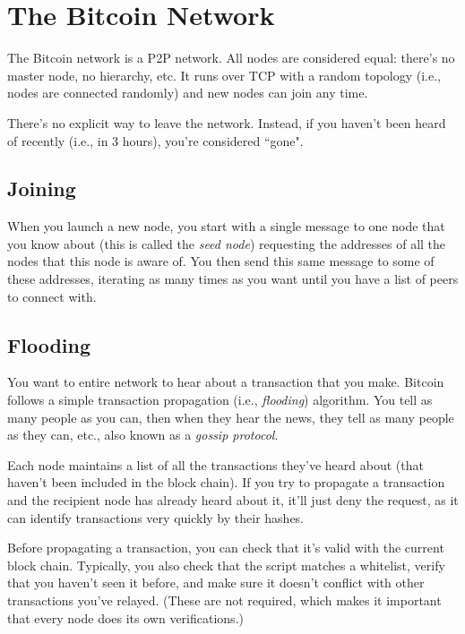 \documentclass[12pt]{article}
\begin{document}
\section*{The Bitcoin Network}

The Bitcoin network is a P2P network. All nodes are considered equal: there's no master node, no hierarchy, etc. It runs over TCP with a random topology (i.e., nodes are connected randomly) and new nodes can join any time.

There's no explicit way to leave the network. Instead, if you haven't been heard of recently (i.e., in 3 hours), you're considered ``gone".

\subsection*{Joining}

When you launch a new node, you start with a single message to one node that you know about (this is called the \textit{seed node}) requesting the addresses of all the nodes that this node is aware of. You then send this same message to some of these addresses, iterating as many times as you want until you have a list of peers to connect with.

\subsection*{Flooding}

You want to entire network to hear about a transaction that you make. Bitcoin follows a simple transaction propagation (i.e., \textit{flooding}) algorithm. You tell as many people as you can, then when they hear the news, they tell as many people as they can, etc., also known as a \textit{gossip protocol}.

Each node maintains a list of all the transactions they've heard about (that haven't been included in the block chain). If you try to propagate a transaction and the recipient node has already heard about it, it'll just deny the request, as it can identify transactions very quickly by their hashes.

Before propagating a transaction, you can check that it's valid with the current block chain. Typically, you also check that the script matches a whitelist, verify that you haven't seen it before, and make sure it doesn't conflict with other transactions you've relayed. (These are not required, which makes it important that every node does its own verifications.)
\end{document}
